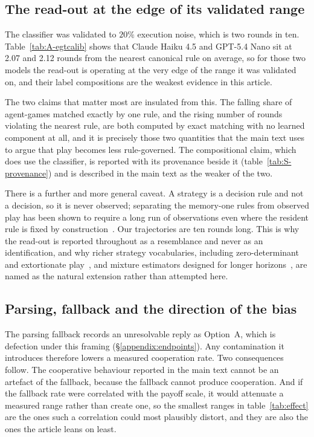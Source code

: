 \documentclass[openacc]{rsproca_new}
\begin{document}
\subsection{The read-out at the edge of its validated range}\label{appendix:robust_readout}

The classifier was validated to $20\%$ execution noise, which is two rounds in
ten. Table~\ref{tab:A-egtcalib} shows that Claude Haiku 4.5 and GPT-5.4 Nano
sit at 2.07 and 2.12 rounds from the nearest canonical rule on average, so for
those two models the read-out is operating at the very edge of the range it was
validated on, and their label compositions are the weakest evidence in this
article.

The two claims that matter most are insulated from this. The falling share of
agent-games matched exactly by one rule, and the rising number of rounds
violating the nearest rule, are both computed by exact matching with no learned
component at all, and it is precisely those two quantities that the main text
uses to argue that play becomes less rule-governed. The compositional claim,
which does use the classifier, is reported with its provenance beside it
(table~\ref{tab:S-provenance}) and is described in the main text as the weaker
of the two.

There is a further and more general caveat. A strategy is a decision rule and
not a decision, so it is never observed; separating the memory-one rules from
observed play has been shown to require a long run of observations even where
the resident rule is fixed by construction~\cite{kim2021win,hilbe2013memory}.
Our trajectories are ten rounds long. This is why the read-out is reported
throughout as a resemblance and never as an identification, and why richer
strategy vocabularies, including zero-determinant and extortionate
play~\cite{pressDyson2012}, and mixture estimators designed for longer
horizons~\cite{fontana2025nicer,inferenceStrategies}, are named as the natural
extension rather than attempted here.

\subsection{Parsing, fallback and the direction of the bias}\label{appendix:robust_parsing}

The parsing fallback records an unresolvable reply as Option~A, which is
defection under this framing (\S\ref{appendix:endpoints}). Any contamination it
introduces therefore lowers a measured cooperation rate. Two consequences
follow. The cooperative behaviour reported in the main text cannot be an
artefact of the fallback, because the fallback cannot produce cooperation. And
if the fallback rate were correlated with the payoff scale, it would attenuate
a measured range rather than create one, so the smallest ranges in
table~\ref{tab:effect} are the ones such a correlation could most plausibly
distort, and they are also the ones the article leans on least.
\end{document}
